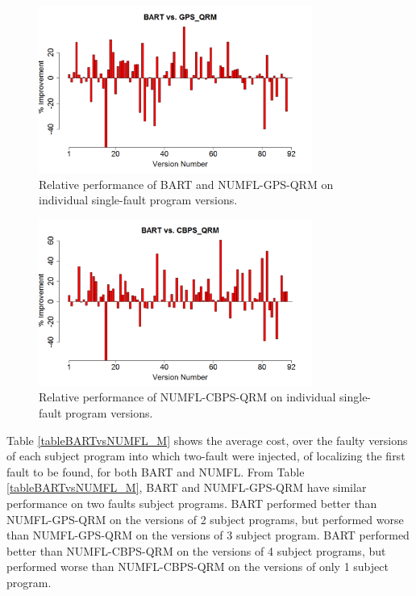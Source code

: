 \begin{figure}[!thpb]
\centering
\includegraphics[width=0.8\textwidth]{chapter4_BARTvsGPS_QRM.pdf}
\caption{Relative performance of BART and NUMFL-GPS-QRM on individual single-fault program versions.}
\label{BARTvsQRM}
\end{figure}

\begin{figure}[!thpb]
\centering
\includegraphics[width=0.8\textwidth]{chapter4_BARTvsCBPS.pdf}
\caption{Relative performance of NUMFL-CBPS-QRM on individual single-fault program versions.}
\label{BARTvsCBPS}
\end{figure}

Table \ref{tableBARTvsNUMFL_M} shows the average cost, over the faulty versions of each subject program into which two-fault were injected, of localizing the first fault to be found, for both BART and NUMFL.  From Table \ref{tableBARTvsNUMFL_M}, BART and NUMFL-GPS-QRM have similar performance on two faults subject programs. BART performed better than NUMFL-GPS-QRM on the versions of  2 subject programs, but performed worse than NUMFL-GPS-QRM on the versions of 3 subject program.  BART performed better than NUMFL-CBPS-QRM on the versions of 4 subject programs, but performed worse than NUMFL-CBPS-QRM on the versions of only 1 subject program.

